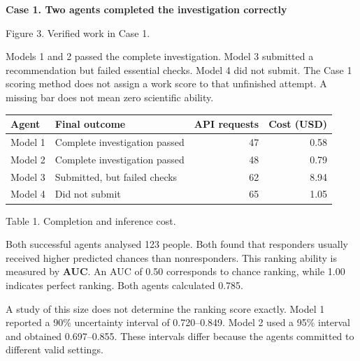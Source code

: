 \documentclass[10pt,a4paper]{article}
\newcommand{\reportcase}[2]{{\Large\bfseries Case #1. #2\par}\vspace{2mm}}
\newcommand{\reporthead}[1]{\vspace{2mm}{\normalsize\bfseries #1\par}}
\newcommand{\reportcaption}[1]{\par{\small\color{Muted}#1\par}\vspace{1mm}}
\begin{document}
\newpage
\reportcase{1}{Two agents completed the investigation correctly}
\begin{center}
\end{center}
\reportcaption{Figure 3. Verified work in Case 1.}

Models 1 and 2 passed the complete investigation. Model 3 submitted a recommendation but failed essential checks. Model 4 did not submit. The Case 1 scoring method does not assign a work score to that unfinished attempt. A missing bar does not mean zero scientific ability.

\begin{tabularx}{\textwidth}{@{}Ylrr@{}}\toprule
Agent & Final outcome & API requests & Cost (USD) \\\midrule
Model 1 & Complete investigation passed & 47 & 0.58 \\
Model 2 & Complete investigation passed & 48 & 0.79 \\
Model 3 & Submitted, but failed checks & 62 & 8.94 \\
Model 4 & Did not submit & 65 & 1.05 \\\bottomrule
\end{tabularx}
\reportcaption{Table 1. Completion and inference cost.}

\reporthead{What the successful agents found}
Both successful agents analysed 123 people. Both found that responders usually received higher predicted chances than nonresponders. This ranking ability is measured by \textbf{AUC}. An AUC of 0.50 corresponds to chance ranking, while 1.00 indicates perfect ranking. Both agents calculated 0.785.

A study of this size does not determine the ranking score exactly. Model 1 reported a 90\% uncertainty interval of 0.720--0.849. Model 2 used a 95\% interval and obtained 0.697--0.855. These intervals differ because the agents committed to different valid settings.
\end{document}
